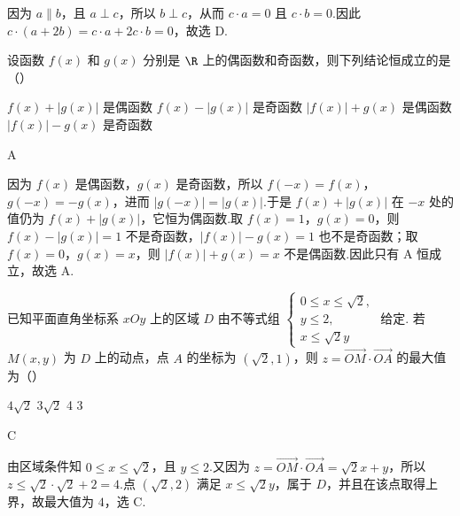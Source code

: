 \begin{solution}
因为 \(a\parallel b\)，且 \(a\perp c\)，所以 \(b\perp c\)，从而 \(c\cdot a=0\) 且 \(c\cdot b=0\).因此 \(c\cdot(a+2b)=c\cdot a+2c\cdot b=0\)，故选 D.
\end{solution}

\begin{problem}
设函数 \( f(x) \) 和 \( g(x) \) 分别是 \( \R \) 上的偶函数和奇函数，则下列结论恒成立的是（\quad）

\choices
    {\(f(x) + |g(x)|\) 是偶函数}
    {\(f(x) - |g(x)|\) 是奇函数}
    {\(|f(x)| + g(x)\) 是偶函数}
    {\( |f(x)| - g(x) \) 是奇函数}
\end{problem}

\begin{answer}
A
\end{answer}

\begin{solution}
因为 \(f(x)\) 是偶函数，\(g(x)\) 是奇函数，所以 \(f(-x)=f(x)\)，\(g(-x)=-g(x)\)，进而 \(\lvert g(-x)\rvert=\lvert g(x)\rvert\).于是 \(f(x)+\lvert g(x)\rvert\) 在 \(-x\) 处的值仍为 \(f(x)+\lvert g(x)\rvert\)，它恒为偶函数.取 \(f(x)=1\)，\(g(x)=0\)，则 \(f(x)-\lvert g(x)\rvert=1\) 不是奇函数，\(\lvert f(x)\rvert-g(x)=1\) 也不是奇函数；取 \(f(x)=0\)，\(g(x)=x\)，则 \(\lvert f(x)\rvert+g(x)=x\) 不是偶函数.因此只有 A 恒成立，故选 A.
\end{solution}

\begin{problem}
已知平面直角坐标系 \(xOy\) 上的区域 \(D\) 由不等式组 \(\begin{cases}
0 \leqslant x \leqslant \sqrt{2},\\
y \leqslant 2,\\
x \leqslant \sqrt{2} y
\end{cases}\) 给定. 若 \(M(x,y)\) 为 \(D\) 上的动点，点 \(A\) 的坐标为 \((\sqrt{2},1)\)，则 \(z = \overrightarrow{OM} \cdot \overrightarrow{OA}\) 的最大值为（\quad）

\choices
    {\(4\sqrt{2}\)}
    {\(3\sqrt{2}\)}
    {4}
    {3}
\end{problem}

\begin{answer}
C
\end{answer}

\begin{solution}
由区域条件知 \(0\leqslant x\leqslant\sqrt{2}\)，且 \(y\leqslant2\).又因为 \(z=\overrightarrow{OM}\cdot\overrightarrow{OA}=\sqrt{2}x+y\)，所以 \(z\leqslant\sqrt{2}\cdot\sqrt{2}+2=4\).点 \((\sqrt{2},2)\) 满足 \(x\leqslant\sqrt{2}y\)，属于 \(D\)，并且在该点取得上界，故最大值为 \(4\)，选 C.
\end{solution}

